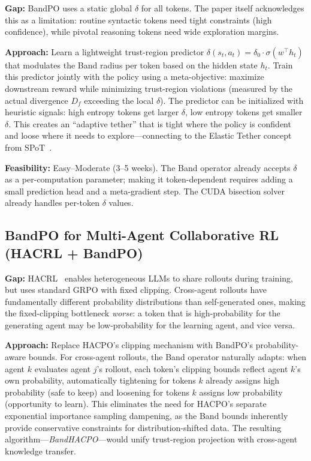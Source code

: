 \documentclass[11pt]{article}
\begin{document}
\textbf{Gap:} BandPO uses a static global $\delta$ for all tokens. The paper itself acknowledges this as a limitation: routine syntactic tokens need tight constraints (high confidence), while pivotal reasoning tokens need wide exploration margins.

\textbf{Approach:} Learn a lightweight trust-region predictor $\delta(s_t, a_t) = \delta_0 \cdot \sigma(w^\top h_t)$ that modulates the Band radius per token based on the hidden state $h_t$. Train this predictor jointly with the policy using a meta-objective: maximize downstream reward while minimizing trust-region violations (measured by the actual divergence $D_f$ exceeding the local $\delta$). The predictor can be initialized with heuristic signals: high entropy tokens get larger $\delta$, low entropy tokens get smaller $\delta$. This creates an ``adaptive tether'' that is tight where the policy is confident and loose where it needs to explore---connecting to the Elastic Tether concept from SPoT~\citep{lin2026spot}.

\textbf{Feasibility:} Easy--Moderate (3--5 weeks). The Band operator already accepts $\delta$ as a per-computation parameter; making it token-dependent requires adding a small prediction head and a meta-gradient step. The CUDA bisection solver already handles per-token $\delta$ values.

\subsection{BandPO for Multi-Agent Collaborative RL (HACRL + BandPO)}

\textbf{Gap:} HACRL~\citep{zhang2026hacrl} enables heterogeneous LLMs to share rollouts during training, but uses standard GRPO with fixed clipping. Cross-agent rollouts have fundamentally different probability distributions than self-generated ones, making the fixed-clipping bottleneck \emph{worse}: a token that is high-probability for the generating agent may be low-probability for the learning agent, and vice versa.

\textbf{Approach:} Replace HACPO's clipping mechanism with BandPO's probability-aware bounds. For cross-agent rollouts, the Band operator naturally adapts: when agent $k$ evaluates agent $j$'s rollout, each token's clipping bounds reflect agent $k$'s own probability, automatically tightening for tokens $k$ already assigns high probability (safe to keep) and loosening for tokens $k$ assigns low probability (opportunity to learn). This eliminates the need for HACPO's separate exponential importance sampling dampening, as the Band bounds inherently provide conservative constraints for distribution-shifted data. The resulting algorithm---\emph{BandHACPO}---would unify trust-region projection with cross-agent knowledge transfer.
\end{document}
